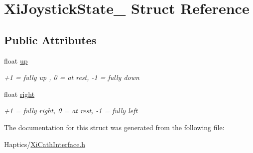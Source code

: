 \hypertarget{structXiJoystickState__}{
\section{XiJoystickState\_\- Struct Reference}
\label{structXiJoystickState__}
}
\subsection*{Public Attributes}
\begin{DoxyCompactItemize}
\item 
\hypertarget{structXiJoystickState___aa1327a887d37521e14392ac38c3be57f}{
float \hyperlink{structXiJoystickState___aa1327a887d37521e14392ac38c3be57f}{up}}
\label{structXiJoystickState___aa1327a887d37521e14392ac38c3be57f}

\begin{DoxyCompactList}\small\item\em +1 = fully up , 0 = at rest, -\/1 = fully down \item\end{DoxyCompactList}\item 
\hypertarget{structXiJoystickState___a2298660ca2b3180b3abc8b5e701ae187}{
float \hyperlink{structXiJoystickState___a2298660ca2b3180b3abc8b5e701ae187}{right}}
\label{structXiJoystickState___a2298660ca2b3180b3abc8b5e701ae187}

\begin{DoxyCompactList}\small\item\em +1 = fully right, 0 = at rest, -\/1 = fully left \item\end{DoxyCompactList}\end{DoxyCompactItemize}


The documentation for this struct was generated from the following file:\begin{DoxyCompactItemize}
\item 
Haptics/\hyperlink{XiCathInterface_8h}{XiCathInterface.h}\end{DoxyCompactItemize}
